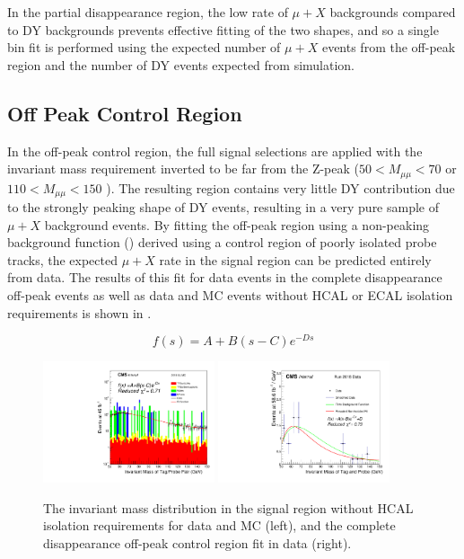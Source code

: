 In the partial disappearance region, the low rate of $\mu+X$ backgrounds compared to DY backgrounds prevents effective fitting of the two shapes, and so a single bin fit is performed using the expected number of $\mu+X$ events from the off-peak region and the number of DY events expected from simulation.

\subsection{Off Peak Control Region}
In the off-peak control region, the full signal selections are applied with the invariant mass requirement inverted to be far from the Z-peak ($50<M_{\mu\mu}<70$ or $110<M_{\mu\mu}<150$ \GeV). 
The resulting region contains very little DY contribution due to the strongly peaking shape of DY events, resulting in a very pure sample of $\mu+X$ background events. 
By fitting the off-peak region using a non-peaking background function () derived using a control region of poorly isolated probe tracks, the expected $\mu+X$ rate in the signal region can be predicted entirely from data. 
The results of this fit for data events in the complete disappearance off-peak events as well as data and MC events without HCAL or ECAL isolation requirements is shown in .

\begin{equation} 
    \label{eq:bkgfunc}
    f(s)=A+B(s-C)e^{-Ds} 
\end{equation}

\begin{figure}[htp]
    \centering
    \includegraphics[width=0.45\textwidth]{figures/offPeakCr_noIso.pdf}
    \hspace{0.01\textwidth}
    \includegraphics[width=0.45\textwidth]{figures/offPeakCr_fit.pdf} 
     \caption[$\mu$+X background fits in the off-peak control region for complete disappearance events]{The invariant mass distribution in the signal region without HCAL isolation requirements for data and MC (left), and the complete disappearance off-peak control region fit in data (right).}
    \label{fig:offpeakfit}
 \end{figure}
 
